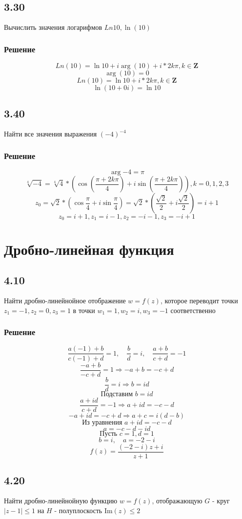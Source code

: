 \documentclass[12pt,a4paper]{article}
\begin{document}
\subsection*{3.30}
Вычислить значения логарифмов $Ln 10,\ln(10)$
\subsubsection*{Решение}
\[
Ln(10) = \ln{10}+i\arg(10)+i*2k\pi, k \in \mathbf{Z}
\]
\[
\arg(10)=0
\]
\[
Ln(10) = \ln{10}+i*2k\pi, k \in \mathbf{Z}
\]
\[
\ln(10+0i)=\ln{10}
\]

\subsection*{3.40}
Найти все значения выражения $(-4)^{-4}$
\subsubsection*{Решение}
\[
\arg{-4}=\pi
\]
\[
\sqrt[4]{-4}=\sqrt[4]{4}*(\cos(\frac{\pi+2k\pi}{4})+i\sin(\frac{\pi+2k\pi}{4})),k=0,1,2,3
\]
\[
z_0=\sqrt{2}*(\cos{\frac{\pi}{4}}+i\sin{\frac{\pi}{4}})=\sqrt{2}*(\frac{\sqrt{2}}{2}+i\frac{\sqrt{2}}{2})=i+1
\]
\[
z_0=i+1,z_1=i-1,z_2=-i-1,z_3=-i+1
\]


\section{Дробно-линейная функция}
\subsection*{4.10}
Найти дробно-линейнойное отображение $w=f(z)$, которое переводит точки $z_1=-1,z_2=0,z_3=1$ в точки $w_1=1,w_2=i,w_3=-1$ соответственно
\subsubsection*{Решение}
\[
\frac{a(-1) + b}{c(-1) + d} = 1, \quad \frac{b}{d} = i, \quad \frac{a + b}{c + d} = -1
\]
\[
\frac{-a + b}{-c + d} = 1 \Rightarrow -a + b = -c + d
\]
\[
\frac{b}{d} = i \Rightarrow b = id
\]
\[
\text{Подставим } b = id 
\]
\[
\frac{a + id}{c + d} = -1 \Rightarrow a + id = -c - d
\]
\[
-a + id = -c + d \Rightarrow a + c = i(d - b)
\]
\[
\text{Из уравнения } a + id = -c - d
\]
\[
a = -c - d - id
\]
\[
\text{Пусть } c = 1, d = 1
\]
\[
b = i, \quad a = -2 - i
\]
\[
f(z) = \frac{(-2-i)z + i}{z + 1}
\]

\subsection*{4.20}
Найти дробно-линейнойную функцию $w=f(z)$, отображающую $G$ - круг $|z-1| \leq 1$ на
$H$ - полуплоскость $\text{Im}(z) \leq 2$
\end{document}
